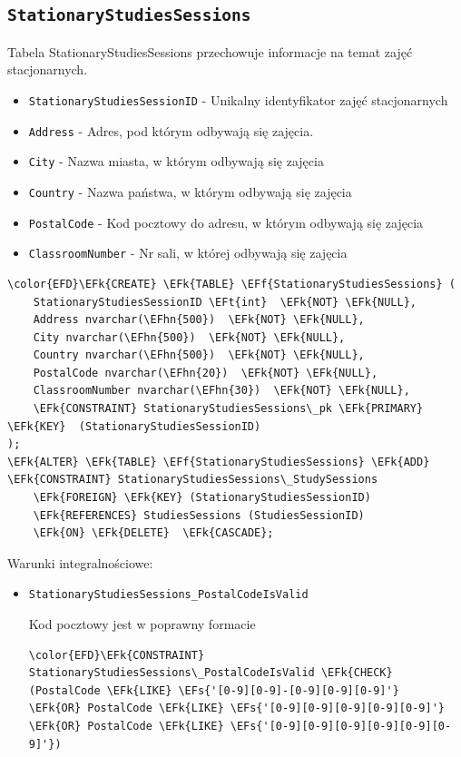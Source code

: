 \documentclass[11pt]{article}
\newcommand{\EFs}[1]{\textcolor{EFs}{#1}} %
\newcommand{\EFk}[1]{\textcolor{EFk}{\textbf{#1}}} %
\newcommand{\EFf}[1]{\textcolor{EFf}{#1}} %
\newcommand{\EFt}[1]{\textcolor{EFt}{\textbf{#1}}} %
\newcommand{\EFhn}[1]{\textcolor{EFhn}{#1}} %
\begin{document}
\subsection{\texttt{StationaryStudiesSessions}}
\label{sec:org79da263}
Tabela StationaryStudiesSessions przechowuje informacje na temat zajęć stacjonarnych.
\begin{itemize}
\item \texttt{StationaryStudiesSessionID} - Unikalny identyfikator zajęć stacjonarnych
\item \texttt{Address} - Adres, pod którym odbywają się zajęcia.
\item \texttt{City} - Nazwa miasta, w którym odbywają się zajęcia
\item \texttt{Country} - Nazwa państwa, w którym odbywają się zajęcia
\item \texttt{PostalCode} - Kod pocztowy do adresu, w którym odbywają się zajęcia
\item \texttt{ClassroomNumber} - Nr sali, w której odbywają się zajęcia
\end{itemize}
\begin{Code}
\begin{Verbatim}
\color{EFD}\EFk{CREATE} \EFk{TABLE} \EFf{StationaryStudiesSessions} (
    StationaryStudiesSessionID \EFt{int}  \EFk{NOT} \EFk{NULL},
    Address nvarchar(\EFhn{500})  \EFk{NOT} \EFk{NULL},
    City nvarchar(\EFhn{500})  \EFk{NOT} \EFk{NULL},
    Country nvarchar(\EFhn{500})  \EFk{NOT} \EFk{NULL},
    PostalCode nvarchar(\EFhn{20})  \EFk{NOT} \EFk{NULL},
    ClassroomNumber nvarchar(\EFhn{30})  \EFk{NOT} \EFk{NULL},
    \EFk{CONSTRAINT} StationaryStudiesSessions\_pk \EFk{PRIMARY} \EFk{KEY}  (StationaryStudiesSessionID)
);
\EFk{ALTER} \EFk{TABLE} \EFf{StationaryStudiesSessions} \EFk{ADD} \EFk{CONSTRAINT} StationaryStudiesSessions\_StudySessions
    \EFk{FOREIGN} \EFk{KEY} (StationaryStudiesSessionID)
    \EFk{REFERENCES} StudiesSessions (StudiesSessionID)
    \EFk{ON} \EFk{DELETE}  \EFk{CASCADE};
\end{Verbatim}
\end{Code}
Warunki integralnościowe:


\begin{itemize}
\item \texttt{StationaryStudiesSessions\_PostalCodeIsValid}

Kod pocztowy jest w poprawny formacie
\begin{Code}
\begin{Verbatim}
\color{EFD}\EFk{CONSTRAINT} StationaryStudiesSessions\_PostalCodeIsValid \EFk{CHECK}
(PostalCode \EFk{LIKE} \EFs{'[0-9][0-9]-[0-9][0-9][0-9]'}
\EFk{OR} PostalCode \EFk{LIKE} \EFs{'[0-9][0-9][0-9][0-9][0-9]'}
\EFk{OR} PostalCode \EFk{LIKE} \EFs{'[0-9][0-9][0-9][0-9][0-9][0-9]'})
\end{Verbatim}
\end{Code}
\end{itemize}
\end{document}
